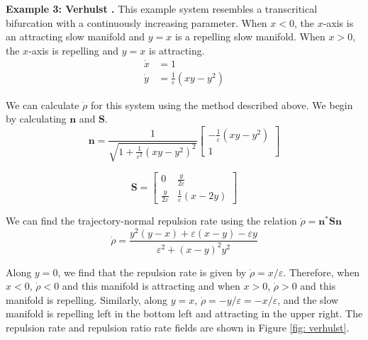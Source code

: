 \documentclass[onecolumn,3p]{elsarticle}
\begin{document}
	\noindent \textbf{Example 3: Verhulst \cite{verhulst2007singular}.} This example system resembles a transcritical bifurcation with a continuously increasing parameter. When $x < 0$, the $x$-axis is an attracting slow manifold and $y=x$ is a repelling slow manifold. When $x > 0$, the $x$-axis is repelling and $y=x$ is attracting.
	\begin{equation}
	\begin{aligned}
	\dot{x} &= 1 \\
	\dot{y} &= \frac{1}{\varepsilon} \left(xy-y^2\right)
	\end{aligned}
	\end{equation}
	
	We can calculate $\dot{\rho}$ for this system using the method described above. We begin by calculating $\mathbf{n}$ and $\mathbf{S}$.
	\begin{equation*}
	\mathbf{n} = \frac{1}{\sqrt{1+\frac{1}{\varepsilon^2}\left(xy-y^2\right)^2}} \left[\begin{array}{c}
	-\frac{1}{\varepsilon} \left(xy-y^2\right) \\
	1
	\end{array}\right]
	\end{equation*}
	
	\begin{equation*}
	\mathbf{S} = \left[\begin{array}{cc}
	0 & \frac{y}{2\varepsilon} \\
	\frac{y}{2\varepsilon} & \frac{1}{\varepsilon}\left(x-2y\right)
	\end{array}\right]
	\end{equation*}
	
	We can find the trajectory-normal repulsion rate using the relation $\dot{\rho}=\mathbf{n}^*\mathbf{S}\mathbf{n}$
	\begin{equation*}
	\dot{\rho} = \frac{y^2\left(y-x\right)+\varepsilon\left(x-y\right)-\varepsilon y}{\varepsilon^2 + \left(x-y\right)^2y^2}
	\end{equation*}
	
	Along $y=0$, we find that the repulsion rate is given by $\dot{\rho} = x/\varepsilon$. Therefore, when $x < 0$, $\dot{\rho}<0$ and this manifold is attracting and when $x > 0$, $\dot{\rho}>0$ and this manifold is repelling. Similarly, along $y=x$, $\dot{\rho} = -y/\varepsilon = -x/\varepsilon$, and the slow manifold is repelling left in the bottom left and attracting in the upper right. The repulsion rate and repulsion ratio rate fields are shown in Figure \ref{fig: verhulst}.
	
\end{document}

